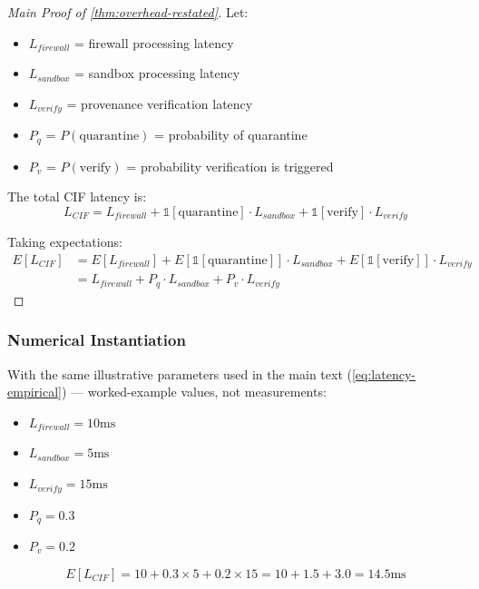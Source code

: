 \documentclass[
]{article}
\begin{document}
\begin{proof}[Main Proof of \cref{thm:overhead-restated}]
Let:
\begin{itemize}
\item $L_{firewall}$ = firewall processing latency
\item $L_{sandbox}$ = sandbox processing latency
\item $L_{verify}$ = provenance verification latency
\item $P_q$ = $P(\text{quarantine})$ = probability of quarantine
\item $P_v$ = $P(\text{verify})$ = probability verification is triggered
\end{itemize}

The total CIF latency is:
\begin{equation}
\label{eq:66-proof-1}
L_{CIF} = L_{firewall} + \mathbb{1}[\text{quarantine}] \cdot L_{sandbox} + \mathbb{1}[\text{verify}] \cdot L_{verify}
\end{equation}

Taking expectations:
\begin{align}
\label{eq:66-proof-2}
E[L_{CIF}] &= E[L_{firewall}] + E[\mathbb{1}[\text{quarantine}]] \cdot L_{sandbox} + E[\mathbb{1}[\text{verify}]] \cdot L_{verify} \\
&= L_{firewall} + P_q \cdot L_{sandbox} + P_v \cdot L_{verify} \nonumber
\end{align}
\end{proof}

\subsubsection{Numerical
Instantiation}\label{sec:numerical-instantiation}

With the same illustrative parameters used in the main text
(\cref{eq:latency-empirical}) --- worked-example values, not
measurements:

\begin{itemize}
\item $L_{firewall} = 10\text{ms}$
\item $L_{sandbox} = 5\text{ms}$
\item $L_{verify} = 15\text{ms}$
\item $P_q = 0.3$
\item $P_v = 0.2$
\end{itemize}

\begin{equation}
\label{eq:numerical-instantiation}
E[L_{CIF}] = 10 + 0.3 \times 5 + 0.2 \times 15 = 10 + 1.5 + 3.0 = 14.5\text{ms}
\end{equation}
\end{document}
